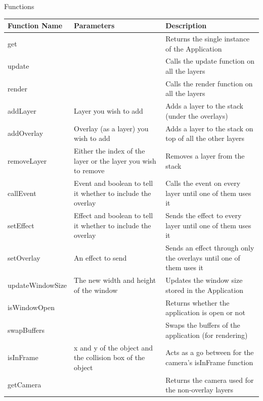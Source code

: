 \documentclass[../../Main.tex]{subfiles}
\begin{document}
\begin{center}
        \clearpage
        Functions
        \begin{tabular}{ | m{} | m{}| m{} | }
            \hline
            \textbf{Function Name} & \textbf{Parameters} & \textbf{Description} \\
            \hline
            get & & Returns the single instance of the Application \\
            \hline
            update & & Calls the update function on all the layers \\
            \hline
            render & & Calls the render function on all the layers \\
            \hline
            addLayer & Layer you wish to add & Adds a layer to the stack (under the overlays)\\
            \hline
            addOverlay & Overlay (as a layer) you wish to add & Adds a layer to the stack on top of all the other layers \\
            \hline
            removeLayer & Either the index of the layer or the layer you wish to remove & Removes a layer from the stack \\
            \hline
            callEvent & Event and boolean to tell it whether to include the overlay & Calls the event on every layer until one of them uses it \\
            \hline
            setEffect & Effect and boolean to tell it whether to include the overlay & Sends the effect to every layer until one of them uses it \\
            \hline
            setOverlay & An effect to send & Sends an effect through only the overlays until one of them uses it \\
            \hline
            updateWindowSize & The new width and height of the window & Updates the window size stored in the Application \\
            \hline
            isWindowOpen & & Returns whether the application is open or not \\
            \hline
            swapBuffers & & Swaps the buffers of the application (for rendering) \\
            \hline
            isInFrame & x and y of the object and the collision box of the object & Acts as a go between for the camera's isInFrame function \\
            \hline
            getCamera & & Returns the camera used for the non-overlay layers \\

\end{tabular}
\end{center}
\end{document}
